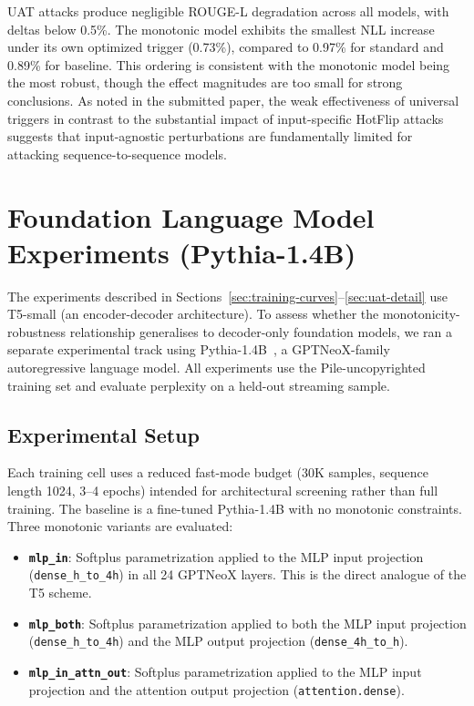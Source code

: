 \documentclass{article}
\begin{document}
UAT attacks produce negligible ROUGE-L degradation across all models, with deltas below 0.5\%. The monotonic model exhibits the smallest NLL increase under its own optimized trigger (0.73\%), compared to 0.97\% for standard and 0.89\% for baseline. This ordering is consistent with the monotonic model being the most robust, though the effect magnitudes are too small for strong conclusions. As noted in the submitted paper, the weak effectiveness of universal triggers in contrast to the substantial impact of input-specific HotFlip attacks suggests that input-agnostic perturbations are fundamentally limited for attacking sequence-to-sequence models.


\section{Foundation Language Model Experiments (Pythia-1.4B)}
\label{sec:foundation-llm}

The experiments described in Sections~\ref{sec:training-curves}--\ref{sec:uat-detail} use T5-small (an encoder-decoder architecture). To assess whether the monotonicity-robustness relationship generalises to decoder-only foundation models, we ran a separate experimental track using Pythia-1.4B~\citep{biderman2023pythia}, a GPTNeoX-family autoregressive language model. All experiments use the Pile-uncopyrighted training set and evaluate perplexity on a held-out streaming sample.

\subsection{Experimental Setup}

Each training cell uses a reduced fast-mode budget (30K samples, sequence length 1024, 3--4 epochs) intended for architectural screening rather than full training. The baseline is a fine-tuned Pythia-1.4B with no monotonic constraints. Three monotonic variants are evaluated:

\begin{itemize}
    \item \textbf{\texttt{mlp\_in}}: Softplus parametrization applied to the MLP input projection (\texttt{dense\_h\_to\_4h}) in all 24 GPTNeoX layers. This is the direct analogue of the T5 scheme.
    \item \textbf{\texttt{mlp\_both}}: Softplus parametrization applied to both the MLP input projection (\texttt{dense\_h\_to\_4h}) and the MLP output projection (\texttt{dense\_4h\_to\_h}).
    \item \textbf{\texttt{mlp\_in\_attn\_out}}: Softplus parametrization applied to the MLP input projection and the attention output projection (\texttt{attention.dense}).
\end{itemize}
\end{document}
